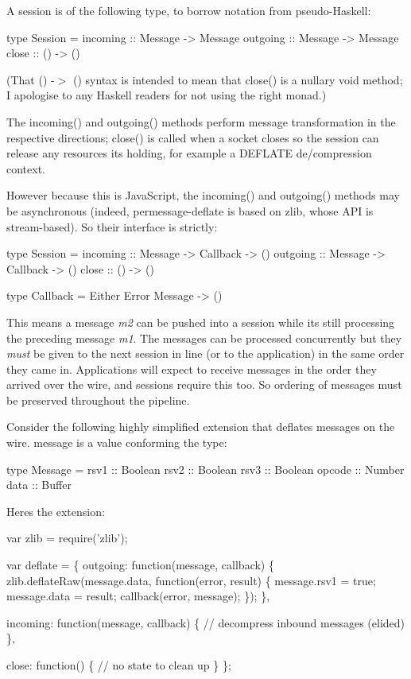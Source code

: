 A session is of the following type, to borrow notation from pseudo-\/\+Haskell\+: \begin{DoxyVerb}type Session = {
  incoming :: Message -> Message
  outgoing :: Message -> Message
  close    :: () -> ()
}
\end{DoxyVerb}


(That {\ttfamily () -\/$>$ ()} syntax is intended to mean that {\ttfamily close()} is a nullary void method; I apologise to any Haskell readers for not using the right monad.)

The {\ttfamily incoming()} and {\ttfamily outgoing()} methods perform message transformation in the respective directions; {\ttfamily close()} is called when a socket closes so the session can release any resources it\textquotesingle{}s holding, for example a D\+E\+F\+L\+A\+TE de/compression context.

However because this is Java\+Script, the {\ttfamily incoming()} and {\ttfamily outgoing()} methods may be asynchronous (indeed, {\ttfamily permessage-\/deflate} is based on {\ttfamily zlib}, whose A\+PI is stream-\/based). So their interface is strictly\+: \begin{DoxyVerb}type Session = {
  incoming :: Message -> Callback -> ()
  outgoing :: Message -> Callback -> ()
  close    :: () -> ()
}

type Callback = Either Error Message -> ()
\end{DoxyVerb}


This means a message {\itshape m2} can be pushed into a session while it\textquotesingle{}s still processing the preceding message {\itshape m1}. The messages can be processed concurrently but they {\itshape must} be given to the next session in line (or to the application) in the same order they came in. Applications will expect to receive messages in the order they arrived over the wire, and sessions require this too. So ordering of messages must be preserved throughout the pipeline.

Consider the following highly simplified extension that deflates messages on the wire. {\ttfamily message} is a value conforming the type\+: \begin{DoxyVerb}type Message = {
  rsv1   :: Boolean
  rsv2   :: Boolean
  rsv3   :: Boolean
  opcode :: Number
  data   :: Buffer
}
\end{DoxyVerb}


Here\textquotesingle{}s the extension\+:


\begin{DoxyCode}
var zlib = require('zlib');

var deflate = \{
  outgoing: function(message, callback) \{
    zlib.deflateRaw(message.data, function(error, result) \{
      message.rsv1 = true;
      message.data = result;
      callback(error, message);
    \});
  \},

  incoming: function(message, callback) \{
    // decompress inbound messages (elided)
  \},

  close: function() \{
    // no state to clean up
  \}
\};
\end{DoxyCode}


